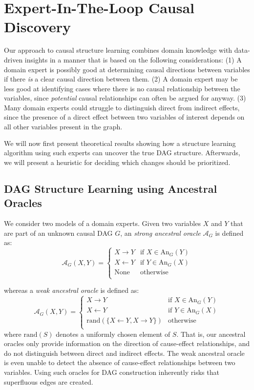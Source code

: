 \documentclass{uai2025} %
\begin{document}
\section{Expert-In-The-Loop Causal Discovery}


Our approach to causal structure learning combines domain knowledge with data-driven
insights in a manner that is based on the following considerations: 
(1) A domain expert is possibly good at determining causal directions between variables if 
there \emph{is} a clear causal direction between them. (2) A domain expert may be less good
at identifying cases where there is no causal relationship between the variables,
since \emph{potential} causal relationships can often be argued for anyway.
(3) Many domain experts could struggle to distinguish direct from indirect 
effects, since the presence of a direct effect between two variables
of interest depends on all other variables present in the graph. 

We will now first present theoretical results showing how a structure
learning algorithm using such experts can uncover the true DAG structure.
Afterwards, we will present a heuristic for deciding which changes should
be prioritized.

\subsection{DAG Structure Learning using Ancestral Oracles}

\label{sec:modification}

We consider two models of a domain experts. Given two variables
$ X $ and $ Y $ that are part of an unknown causal DAG $G$, an \emph{strong ancestral oracle} 
$\mathcal{A}_G$ is defined as:
$$\mathcal{A}_G(X,Y)=\begin{cases}
 X \to Y & \textrm{if } X \in \textrm{An}_G(Y) \\
 X \gets Y & \textrm{if } Y \in \textrm{An}_G(X) \\
 \textrm{None} & \textrm{otherwise} \\
\end{cases}$$

whereas a \emph{weak ancestral oracle} is defined as:
$$
\mathcal{A}_G(X,Y)=\begin{cases}
 X \to Y & \textrm{if } X \in \textrm{An}_G(Y) \\
 X \gets Y & \textrm{if } Y \in \textrm{An}_G(X) \\
 \textrm{rand}(\{X \gets Y, X \to Y\}) & \textrm{otherwise} \\
\end{cases}
$$
where $\textrm{rand}(S)$ denotes a uniformly chosen element of $S$.
That is, our ancestral oracles only provide information on the direction of cause-effect
relationships, and do not distinguish between direct and indirect effects. 
The weak ancestral oracle is even unable to detect the absence of cause-effect
relationships between two variables. Using such oracles for DAG construction  
inherently risks that superfluous edges are created. 
\end{document}
